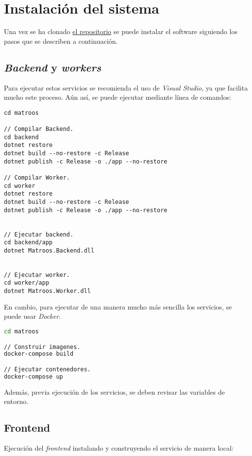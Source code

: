\chapter{Instalación del sistema}

Una vez se ha clonado \href{https://github.com/harvestcore/matroos}{el repositorio} se puede instalar el software siguiendo los pasos que se describen a continuación.

\section{\textit{Backend} y \textit{workers}}


Para ejecutar estos servicios se recomienda el uso de \textit{Visual Studio}, ya que facilita mucho este proceso. Aún así, se puede ejecutar mediante línea de comandos:

\begin{lstlisting}
cd matroos

// Compilar Backend.
cd backend
dotnet restore
dotnet build --no-restore -c Release
dotnet publish -c Release -o ./app --no-restore

// Compilar Worker.
cd worker
dotnet restore
dotnet build --no-restore -c Release
dotnet publish -c Release -o ./app --no-restore


// Ejecutar backend.
cd backend/app
dotnet Matroos.Backend.dll


// Ejecutar worker.
cd worker/app
dotnet Matroos.Worker.dll
\end{lstlisting}

En cambio, para ejecutar de una manera mucho más sencilla los servicios, se puede usar \textit{Docker}.

\begin{lstlisting}[language=sh]
cd matroos

// Construir imagenes.
docker-compose build

// Ejecutar contenedores.
docker-compose up
\end{lstlisting}

Además, previa ejecución de los servicios, se deben revisar las variables de entorno.




\section{Frontend}

Ejecución del \textit{frontend} instalando y construyendo el servicio de manera local:

